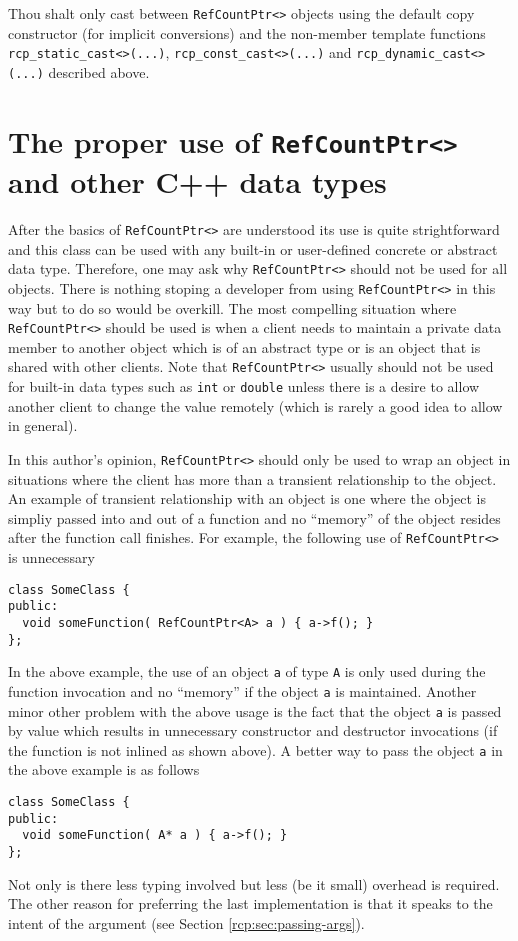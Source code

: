 \begin{commandment}
Thou shalt only cast between {}\texttt{RefCountPtr<>} objects using the
default copy constructor (for implicit conversions) and the non-member
template functions {}\texttt{rcp\-\_static\-\_cast<>(...)},
{}\texttt{rcp\-\_const\-\_cast<>(...)} and
{}\texttt{rcp\-\_dynamic\-\_cast<>(...)}  described above.
\end{commandment}


%
\section{The proper use of {}\texttt{RefCountPtr<>} and other C++ data types}
%

After the basics of {}\texttt{RefCountPtr<>} are understood its use is
quite strightforward and this class can be used with any built-in or
user-defined concrete or abstract data type.  Therefore, one may ask
why {}\texttt{RefCountPtr<>} should not be used for all objects.  There
is nothing stoping a developer from using {}\texttt{RefCountPtr<>} in
this way but to do so would be overkill.  The most compelling
situation where {}\texttt{RefCountPtr<>} should be used is when a client
needs to maintain a private data member to another object which is of
an abstract type or is an object that is shared with other clients.
Note that {}\texttt{RefCountPtr<>} usually should not be used for
built-in data types such as {}\texttt{int} or {}\texttt{double} unless
there is a desire to allow another client to change the value remotely
(which is rarely a good idea to allow in general).

In this author's opinion, {}\texttt{RefCountPtr<>} should only be used
to wrap an object in situations where the client has more than a
transient relationship to the object.  An example of transient
relationship with an object is one where the object is simpliy passed
into and out of a function and no ``memory'' of the object resides
after the function call finishes.  For example, the following use
of {}\texttt{RefCountPtr<>} is unnecessary
%
{\scriptsize\begin{verbatim}
class SomeClass {
public:
  void someFunction( RefCountPtr<A> a ) { a->f(); }
};
\end{verbatim}}
%
\noindent{}
In the above example, the use of an object {}\texttt{a} of type
{}\texttt{A} is only used during the function invocation and no
``memory'' if the object {}\texttt{a} is maintained.  Another minor
other problem with the above usage is the fact that the object
{}\texttt{a} is passed by value which results in unnecessary
constructor and destructor invocations (if the function is not inlined
as shown above).  A better way to pass the object {}\texttt{a} in the
above example is as follows
%
{\scriptsize\begin{verbatim}
class SomeClass {
public:
  void someFunction( A* a ) { a->f(); }
};
\end{verbatim}}
%
\noindent{}
Not only is there less typing involved but less (be it small) overhead
is required.  The other reason for preferring the last implementation
is that it speaks to the intent of the argument (see Section
{}\ref{rcp:sec:passing-args}).

